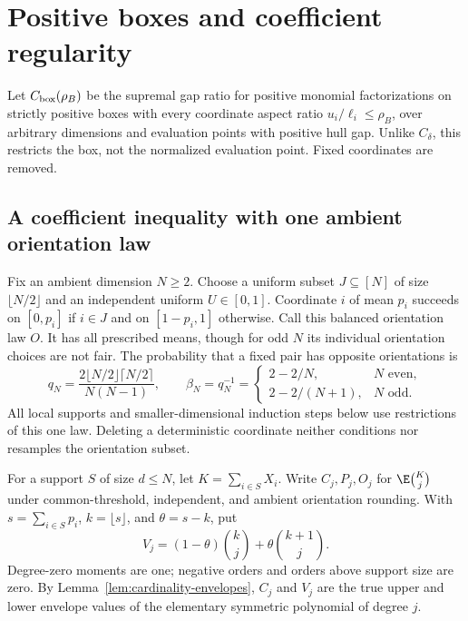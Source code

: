 \section{Positive boxes and coefficient regularity}\label{sec:positive-boxes}
Let $C_{\rm box}(\rho_B)$ be the supremal gap ratio for positive monomial
factorizations on strictly positive boxes with every coordinate aspect
ratio $u_i/\ell_i\le\rho_B$, over arbitrary dimensions and evaluation
points with positive hull gap. Unlike $C_\delta$, this restricts the box,
not the normalized evaluation point. Fixed coordinates are removed.

\subsection{A coefficient inequality with one ambient orientation law}
Fix an ambient dimension $N\ge2$. Choose a uniform subset $J\subseteq[N]$
of size $\lfloor N/2\rfloor$ and an independent uniform $U\in[0,1]$.
Coordinate $i$ of mean $p_i$ succeeds on $[0,p_i]$ if $i\in J$ and on
$[1-p_i,1]$ otherwise. Call this balanced orientation law $O$. It has
all prescribed means, though for odd $N$ its individual orientation
choices are not fair. The probability that a fixed pair has opposite
orientations is
\[
 q_N=\frac{2\lfloor N/2\rfloor\lceil N/2\rceil}{N(N-1)},\qquad
 \beta_N=q_N^{-1}=
 \begin{cases}2-2/N,&N\text{ even},\\2-2/(N+1),&N\text{ odd}.
 \end{cases}
\]
All local supports and smaller-dimensional induction steps below use
restrictions of this one law. Deleting a deterministic coordinate
neither conditions nor resamples the orientation subset.

For a support $S$ of size $d\le N$, let $K=\sum_{i\in S}X_i$.
Write $C_j,P_j,O_j$ for $\E\binom Kj$ under common-threshold,
independent, and ambient orientation rounding. With
$s=\sum_{i\in S}p_i$, $k=\lfloor s\rfloor$, and $\theta=s-k$, put
\[
 V_j=(1-\theta)\binom kj+\theta\binom{k+1}j.
\]
Degree-zero moments are one; negative orders and orders above support
size are zero. By Lemma~\ref{lem:cardinality-envelopes}, $C_j$ and $V_j$
are the true upper and lower envelope values of the elementary
symmetric polynomial of degree $j$.

